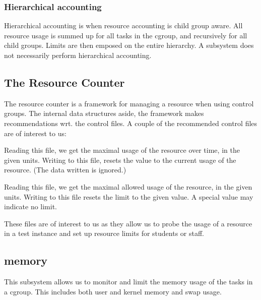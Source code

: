 \subsubsection{Hierarchical accounting}

Hierarchical accounting is when resource accounting is child group aware. All
resource usage is summed up for all tasks in the cgroup, and recursively
for all child groups. Limits are then emposed on the entire hierarchy. A
subsystem does not necessarily perform hierarchical accounting.

\subsection{The Resource Counter}

\label{section:cgroups:resource-counter}

The resource counter is a framework for managing a resource when using control
groups.  The internal data structures aside, the framework makes
recommendations wrt. the control files. A couple of the recommended control
files are of interest to us:

\begin{description}[\setleftmargin{0.2in}\breaklabel\setlabelstyle{\tt}]

\item[<resource>.max\_usage\_in\_<unit\_of\_measurement>] Reading this file, we
get the maximal usage of the resource over time, in the given units. Writing to
this file, resets the value to the current usage of the resource. (The data
written is ignored.)

\item[<resource>.limit\_in\_<unit\_of\_measurement>] Reading this file, we get
the maximal allowed usage of the resource, in the given units. Writing to this
file resets the limit to the given value. A special value may indicate no
limit.

\end{description}

These files are of interest to us as they allow us to probe the usage of a
resource in a test instance and set up resource limits for students or staff.

\subsection{memory}

This subsystem allows us to monitor and limit the memory usage of the tasks in
a cgroup. This includes both user and kernel memory and swap
usage\cite{documentation-cgroups-memory.txt}.

